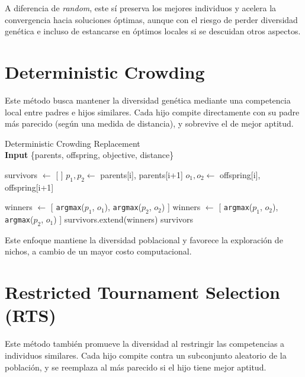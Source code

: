 A diferencia de \textit{random}, este sí preserva los mejores individuos y acelera la convergencia hacia soluciones óptimas, aunque con el riesgo de perder diversidad genética e incluso de estancarse en óptimos locales si se descuidan otros aspectos.

\section{Deterministic Crowding}

Este método busca mantener la diversidad genética mediante una competencia local entre padres e hijos similares. Cada hijo compite directamente con su padre más parecido (según una medida de distancia), y sobrevive el de mejor aptitud.

\begin{algorithm}[H]
	\caption{Deterministic Crowding Replacement \\ \textbf{Input} \{parents, offspring, objective, distance\}}
	\begin{algorithmic}[1]
		\State survivors $\gets$ [ ]
		\State $p_1, p_2 \gets$ parents[i], parents[i+1]
		\State $o_1, o_2 \gets$ offspring[i], offspring[i+1]
		
		\State winners $\gets$ [ \texttt{argmax}($p_1$, $o_1$), \texttt{argmax}($p_2$, $o_2$) ]
		\Else
		\State winners $\gets$ [ \texttt{argmax}($p_1$, $o_2$), \texttt{argmax}($p_2$, $o_1$) ]
		\EndIf
		\State survivors.extend(winners)
		\EndFor
		\State \Return survivors
		\EndFunction
	\end{algorithmic}
	\label{alg:replacement_deterministic_crowding}
\end{algorithm}

Este enfoque mantiene la diversidad poblacional y favorece la exploración de nichos, a cambio de un mayor costo computacional.

\section{Restricted Tournament Selection (RTS)}

Este método también promueve la diversidad al restringir las competencias a individuos similares. Cada hijo compite contra un subconjunto aleatorio de la población, y se reemplaza al más parecido si el hijo tiene mejor aptitud.


